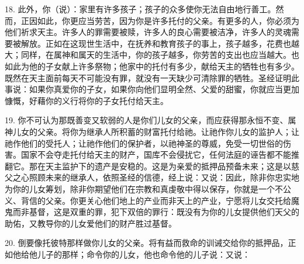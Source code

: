 18. 此外，你（说）：家里有许多孩子；孩子的众多使你无法自由地行善工。然而，正因如此，你更应当劳苦，因为你是许多托付的父亲。有更多的人，你必须为他们祈求天主。许多人的罪需要被赎，许多人的良心需要被洁净，许多人的灵魂需要被解放。正如在这现世生活中，在抚养和教育孩子的事上，孩子越多，花费也越大；同样，在属神和属天的生活中，你的孩子越多，你劳苦的支出也应当越大。也如此为他的子女献上许多祭物；他家中的托付有多少，献给天主的牺牲也有多少。既然在天主面前每天不可能没有罪，就没有一天缺少可清除罪的牺牲。圣经证明此事说：如果你真爱你的子女，如果你向他们显明全然、父爱的甜蜜，你就应当更加慷慨，好藉你的义行将你的子女托付给天主。\par

19. 你不可认为那既善变又软弱的人是你们儿女的父亲，而应获得那永恒不变、属神儿女的父亲。将你为继承人所积蓄的财富托付给祂。让祂作你儿女的监护人；让祂作他们的受托人；让祂作他们的保护者，以祂神圣的尊威，免受一切世俗的伤害。国家不会夺走托付给天主的财产，国库不会侵扰它，任何法庭的诬告都不能推翻它。那在天主监护下的遗产是安稳的。这是为亲爱的抵押品预备未来；这是以慈父之心照顾未来的继承人，依照圣经的信德，经上说：又说：因此，除非你忠实地为你的儿女筹划，除非你期望他们在宗教和真虔敬中得以保存，你就是一个不公义、背信的父亲。你更关心他们地上的产业而非天上的产业，宁愿将儿女交托给魔鬼而非基督，这是双重的罪，犯下双倍的罪行：既没有为你的儿女提供他们天父的助佑，又教导你的儿女爱他们的财产胜过基督。\par

20. 倒要像托彼特那样做你儿女的父亲。将有益而救命的训诫交给你的抵押品，正如他给他儿子的那样；命令你的儿女，他也命令他的儿子说：又说：\par


